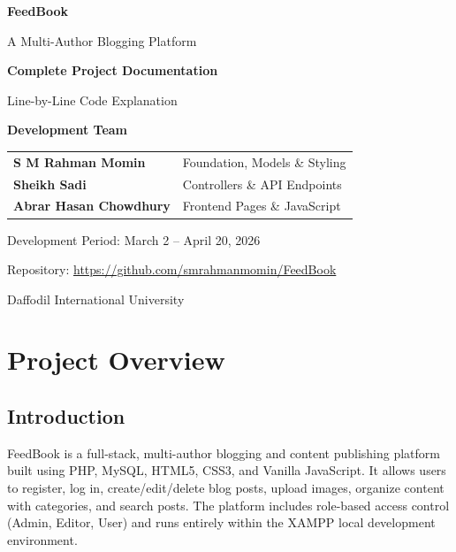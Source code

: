 \documentclass[12pt,a4paper]{report}
\begin{document}
\begin{titlepage}
\centering
\vspace*{2cm}
{\Huge\bfseries\textcolor{primary}{FeedBook}\par}
\vspace{0.5cm}
{\LARGE A Multi-Author Blogging Platform\par}
\vspace{1.5cm}
{\Large\textbf{Complete Project Documentation}\par}
{\large Line-by-Line Code Explanation\par}
\vspace{2cm}
{\large\textbf{Development Team}\par}
\vspace{0.5cm}
\begin{tabular}{l l}
\textbf{S M Rahman Momin} & Foundation, Models \& Styling \\
\textbf{Sheikh Sadi} & Controllers \& API Endpoints \\
\textbf{Abrar Hasan Chowdhury} & Frontend Pages \& JavaScript \\
\end{tabular}
\vspace{1.5cm}

{\large Development Period: March 2 -- April 20, 2026\par}
\vspace{0.5cm}
{\normalsize Repository: \url{https://github.com/smrahmanmomin/FeedBook}\par}
\vfill
{\normalsize Daffodil International University\par}
\end{titlepage}

\tableofcontents
\newpage

\chapter{Project Overview}

\section{Introduction}
FeedBook is a full-stack, multi-author blogging and content publishing platform built using PHP, MySQL, HTML5, CSS3, and Vanilla JavaScript. It allows users to register, log in, create/edit/delete blog posts, upload images, organize content with categories, and search posts. The platform includes role-based access control (Admin, Editor, User) and runs entirely within the XAMPP local development environment.
\end{document}
